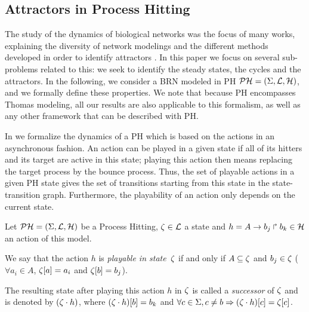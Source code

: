 \subsection{Attractors in Process Hitting}

The study of the dynamics of biological networks was the focus of many works, explaining the diversity of network modelings and the different methods developed in order to identify attractors \cite{skodawessely2011finding, zhang2007algorithms, mushthofa2014asp, akutsu2012finding, berntenis2013detection}.
In this paper we focus on several sub-problems related to this: we seek to identify the steady states, the cycles and the attractors. %
In the following, we consider a BRN modeled in PH $\mathcal{PH}=(\Sigma,\mathcal{L},\mathcal{H})$,
and we formally define these properties.
We note that because PH encompasses Thomas modeling, all our results are also applicable to this formalism, as well as any other framework that can be described with PH.

In  we formalize the dynamics of a PH which is based on the actions in an asynchronous fashion.
An action can be played in a given state if all of its hitters and its target are active in this state; playing this action then means replacing the target process by the bounce process.
Thus, the set of playable actions in a given PH state gives the set of transitions starting from this state in the state-transition graph.
Furthermore, the playability of an action only depends on the current state.

\begin{definition}
\label{def:playableAction}
Let $\mathcal{PH} = (\Sigma,\mathcal{L},\mathcal{H})$ be a Process Hitting, $\zeta \in \mathcal{L}$ a state and $h = A\rightarrow b_j\Rsh b_k \in \mathcal{H}$ an action of this model.

We say that the action $h$
is \emph{playable in state~$\zeta$} if and only if
$A \subseteq \zeta$ and $b_j \in \zeta$ (\ie $\forall a_i \in A$, ${\zeta[a]} = a_i$ and ${\zeta[b]}=b_j$).

The resulting state after playing this action $h$ in $\zeta$
is called a \emph{successor} of $\zeta$ and
is denoted by $(\zeta \cdot h)$,
where ${(\zeta \cdot h)[b]} = b_k$ and
$\forall c \in \Sigma, c \neq b \Rightarrow {(\zeta\cdot h)[c]}={\zeta[c]}$.
\end{definition}

